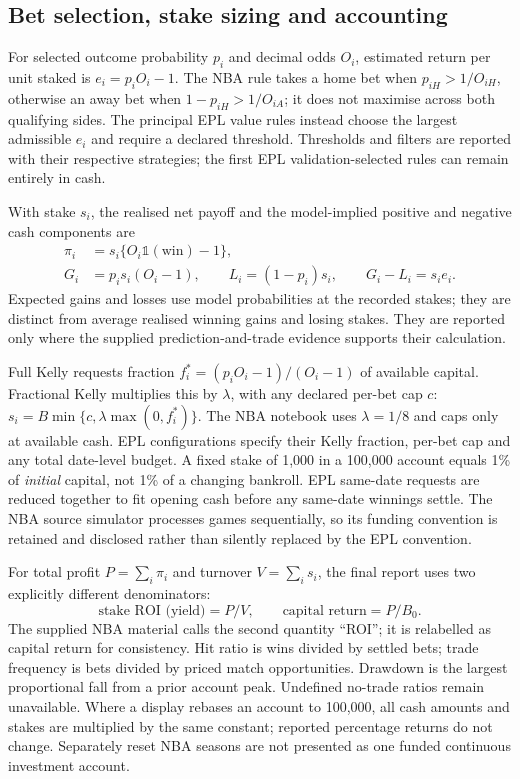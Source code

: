 \subsection{Bet selection, stake sizing and accounting}
For selected outcome probability $p_i$ and decimal odds $O_i$, estimated
return per unit staked is $e_i=p_iO_i-1$. The NBA rule takes a home bet when
$p_{iH}>1/O_{iH}$, otherwise an away bet when
$1-p_{iH}>1/O_{iA}$; it does not maximise across both qualifying sides.
The principal EPL value rules instead choose the largest admissible $e_i$
and require a declared threshold. Thresholds and filters are reported with
their respective strategies; the first EPL validation-selected rules can
remain entirely in cash.

With stake $s_i$, the realised net payoff and the model-implied positive and
negative cash components are
\begin{align}
 \pi_i&=s_i\{O_i\mathbb{1}(\text{win})-1\},\\
 G_i&=p_i s_i(O_i-1),\qquad L_i=(1-p_i)s_i,
 \qquad G_i-L_i=s_i e_i.
\end{align}
Expected gains and losses use model probabilities at the recorded stakes;
they are distinct from average realised winning gains and losing stakes.
They are reported only where the supplied prediction-and-trade evidence
supports their calculation.

Full Kelly requests fraction $f_i^*=(p_iO_i-1)/(O_i-1)$ of available capital.
Fractional Kelly multiplies this by $\lambda$, with any declared per-bet cap
$c$: $s_i=B\min\{c,\lambda\max(0,f_i^*)\}$.
The NBA notebook uses $\lambda=1/8$ and caps only at available cash. EPL
configurations specify their Kelly fraction, per-bet cap and any total
date-level budget. A fixed stake of 1,000 in a 100,000 account equals 1\%
of \emph{initial} capital, not 1\% of a changing bankroll. EPL same-date
requests are reduced together to fit opening cash before any same-date
winnings settle. The NBA source simulator processes games sequentially, so
its funding convention is retained and disclosed rather than silently
replaced by the EPL convention.

For total profit $P=\sum_i\pi_i$ and turnover $V=\sum_i s_i$, the final report
uses two explicitly different denominators:
\begin{equation}
 \text{stake ROI (yield)}=P/V,\qquad
 \text{capital return}=P/B_0.
\end{equation}
The supplied NBA material calls the second quantity ``ROI''; it is relabelled
as capital return for consistency. Hit ratio is wins divided by settled bets;
trade frequency is bets divided by priced match opportunities. Drawdown is
the largest proportional fall from a prior account peak. Undefined no-trade
ratios remain unavailable. Where a display rebases an account to 100,000,
all cash amounts and stakes are multiplied by the same constant; reported
percentage returns do not change. Separately reset NBA seasons are not
presented as one funded continuous investment account.

